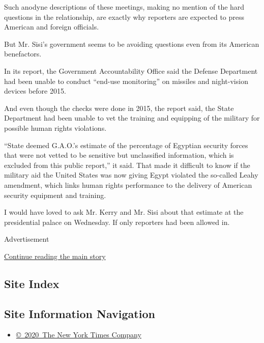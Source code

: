 Such anodyne descriptions of these meetings, making no mention of the
hard questions in the relationship, are exactly why reporters are
expected to press American and foreign officials.

But Mr. Sisi's government seems to be avoiding questions even from its
American benefactors.

In its report, the Government Accountability Office said the Defense
Department had been unable to conduct ``end-use monitoring'' on missiles
and night-vision devices before 2015.

And even though the checks were done in 2015, the report said, the State
Department had been unable to vet the training and equipping of the
military for possible human rights violations.

``State deemed G.A.O.'s estimate of the percentage of Egyptian security
forces that were not vetted to be sensitive but unclassified
information, which is excluded from this public report,'' it said. That
made it difficult to know if the military aid the United States was now
giving Egypt violated the so-called Leahy amendment, which links human
rights performance to the delivery of American security equipment and
training.

I would have loved to ask Mr. Kerry and Mr. Sisi about that estimate at
the presidential palace on Wednesday. If only reporters had been allowed
in.

Advertisement

\protect\hyperlink{after-bottom}{Continue reading the main story}

\hypertarget{site-index}{%
\subsection{Site Index}\label{site-index}}

\hypertarget{site-information-navigation}{%
\subsection{Site Information
Navigation}\label{site-information-navigation}}

\begin{itemize}
\tightlist
\item
  \href{https://help.nytimes3xbfgragh.onion/hc/en-us/articles/115014792127-Copyright-notice}{©~2020~The
  New York Times Company}
\end{itemize}

